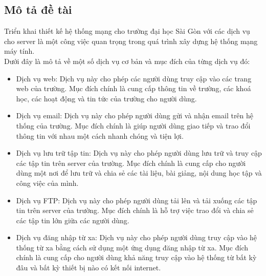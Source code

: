 \documentclass[12pt, a4paper]{article}
\begin{document}
	\subsection{Mô tả đề tài}
	\begin{flushleft}
		\hspace{1.5cm}Triển khai thiết kế hệ thống mạng cho trường đại học Sài Gòn với các dịch vụ cho server là một công việc quan trọng trong quá trình xây dựng hệ thống mạng máy tính.
		\\\hspace{1.5cm}Dưới đây là mô tả về một số dịch vụ cơ bản và mục đích của từng dịch vụ đó:
		\begin{itemize}[leftmargin=0.75cm, itemsep=0pt, topsep=0pt]
			\item Dịch vụ web: Dịch vụ này cho phép các người dùng truy cập vào các trang web của trường. Mục đích chính là cung cấp thông tin về trường, các khoá học, các hoạt động và tin tức của trường cho người dùng.
			\item  Dịch vụ email: Dịch vụ này cho phép người dùng gửi và nhận email trên hệ thống của trường. Mục đích chính là giúp người dùng giao tiếp và trao đổi thông tin với nhau một cách nhanh chóng và tiện lợi.
			\item  Dịch vụ lưu trữ tập tin: Dịch vụ này cho phép người dùng lưu trữ và truy cập các tập tin trên server của trường. Mục đích chính là cung cấp cho người dùng một nơi để lưu trữ và chia sẻ các tài liệu, bài giảng, nội dung học tập và công việc của mình.
			\item Dịch vụ FTP: Dịch vụ này cho phép người dùng tải lên và tải xuống các tập tin trên server của trường. Mục đích chính là hỗ trợ việc trao đổi và chia sẻ các tập tin lớn giữa các người dùng.
			\item Dịch vụ đăng nhập từ xa: Dịch vụ này cho phép người dùng truy cập vào hệ thống từ xa bằng cách sử dụng một ứng dụng đăng nhập từ xa. Mục đích chính là cung cấp cho người dùng khả năng truy cập vào hệ thống từ bất kỳ đâu và bất kỳ thiết bị nào có kết nối internet.
		\end{itemize}
	\end{flushleft}
	
	\newpage
\end{document}
